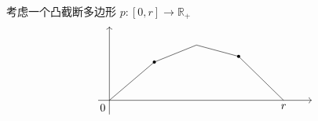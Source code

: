 考虑一个凸截断多边形 $p:[0,r]\to\mathbb{R}_+$
\[
\begin{tikzpicture}[scale=0.9]
\draw[->] (-0.4,0) -- (7.2,0);
\draw[->] (0,-0.5) -- (0,2.6);
\draw (0,0) -- (1.6,1.35) -- (3.1,1.95) -- (4.6,1.55) -- (6.2,0);
\fill (1.6,1.35) circle (1.6pt);
\fill (4.6,1.55) circle (1.6pt);
\node[below left] at (0,0) {$0$};
\node[below] at (6.2,0) {$r$};
\end{tikzpicture}
\]

%
